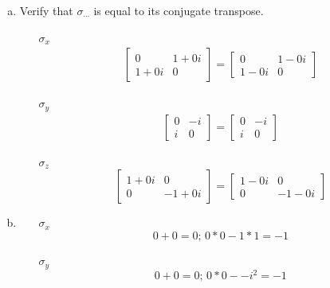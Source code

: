 \documentclass[12pt]{article}
\begin{document}
\section{} %
\begin{enumerate}[(a)]
	\item Verify that $ \sigma_{\cdots} $ is equal to its conjugate transpose.
		\begin{enumerate}
			\item [$ \sigma_x $]
				\begin{align*}
					\begin{bmatrix}
						0 & 1+0i\\
						1+0i & 0
					\end{bmatrix}
					= 
						\begin{bmatrix}
							0 & 1-0i\\
							1-0i & 0
						\end{bmatrix}
				\end{align*}
			
			\item [$ \sigma_y $]
				\begin{align*}
					\begin{bmatrix}
						0 & -i\\
						i & 0
					\end{bmatrix}
						=
						\begin{bmatrix}
							0 & -i\\
							i & 0
						\end{bmatrix}
				\end{align*}
			
			\item [$ \sigma_z $]
				\[
					\begin{bmatrix}
						1+0i & 0\\
						0 & -1+0i
					\end{bmatrix}
						=
						\begin{bmatrix}
							1-0i & 0\\
							0 & -1-0i
						\end{bmatrix}
				\]
		\end{enumerate}
	
	\item 
		\begin{enumerate}
			\item [$ \sigma_x $]
			\[
				0 + 0 = 0;\, 0*0-1*1=-1
			\]
			
			\item [$ \sigma_y $]
			\[
				0+0=0;\, 0*0--i^2=-1
			\]
			

\end{enumerate}
\end{enumerate}
\end{document}

